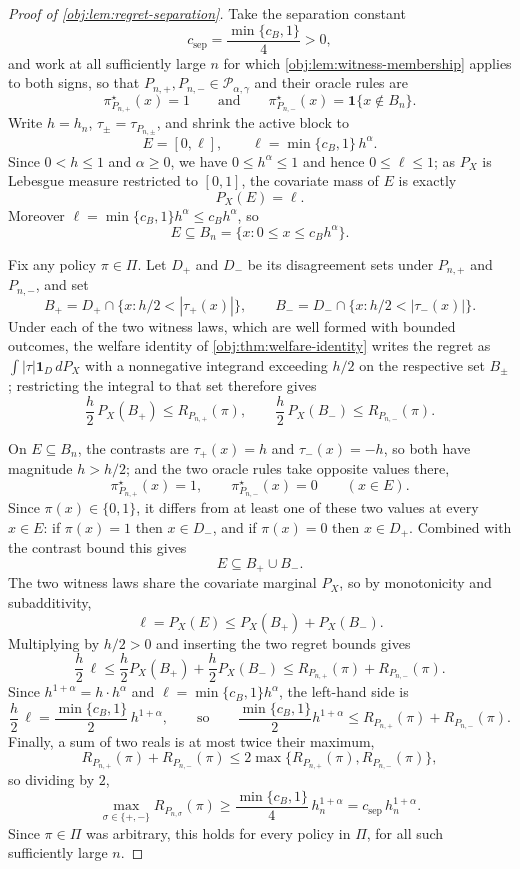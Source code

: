 \documentclass[11pt]{article}
\begin{document}
\begin{proof}[Proof of \cref{obj:lem:regret-separation}]
Take the separation constant
\[
c_{\mathrm{sep}}=\frac{\min\{c_B,1\}}{4}>0,
\]
and work at all sufficiently large \(n\) for which \cref{obj:lem:witness-membership} applies to both signs, so that \(P_{n,+},P_{n,-}\in\mathcal P_{\alpha,\gamma}\) and their oracle rules are
\[
\pi^\star_{P_{n,+}}(x)=1
\qquad\text{and}\qquad
\pi^\star_{P_{n,-}}(x)=\mathbf 1\{x\notin B_n\}.
\]
Write \(h=h_n\), \(\tau_\pm=\tau_{P_{n,\pm}}\), and shrink the active block to
\[
E=[0,\ell],
\qquad
\ell=\min\{c_B,1\}\,h^\alpha .
\]
Since \(0<h\le1\) and \(\alpha\ge0\), we have \(0\le h^\alpha\le1\) and hence \(0\le\ell\le1\); as \(P_X\) is Lebesgue measure restricted to \([0,1]\), the covariate mass of \(E\) is exactly
\[
P_X(E)=\ell .
\]
Moreover \(\ell=\min\{c_B,1\}h^\alpha\le c_Bh^\alpha\), so
\[
E\subseteq B_n=\{x:0\le x\le c_Bh^\alpha\}.
\]

Fix any policy \(\pi\in\Pi\).  Let \(D_+\) and \(D_-\) be its disagreement sets under \(P_{n,+}\) and \(P_{n,-}\), and set
\[
B_+=D_+\cap\{x:h/2<|\tau_+(x)|\},
\qquad
B_-=D_-\cap\{x:h/2<|\tau_-(x)|\}.
\]
Under each of the two witness laws, which are well formed with bounded outcomes, the welfare identity of \cref{obj:thm:welfare-identity} writes the regret as \(\int|\tau|\mathbf 1_D\,dP_X\) with a nonnegative integrand exceeding \(h/2\) on the respective set \(B_\pm\); restricting the integral to that set therefore gives
\[
\frac h2\,P_X(B_+)\le R_{P_{n,+}}(\pi),
\qquad
\frac h2\,P_X(B_-)\le R_{P_{n,-}}(\pi).
\]

On \(E\subseteq B_n\), the contrasts are \(\tau_+(x)=h\) and \(\tau_-(x)=-h\), so both have magnitude \(h>h/2\); and the two oracle rules take opposite values there,
\[
\pi^\star_{P_{n,+}}(x)=1,
\qquad
\pi^\star_{P_{n,-}}(x)=0
\qquad (x\in E).
\]
Since \(\pi(x)\in\{0,1\}\), it differs from at least one of these two values at every \(x\in E\): if \(\pi(x)=1\) then \(x\in D_-\), and if \(\pi(x)=0\) then \(x\in D_+\).  Combined with the contrast bound this gives
\[
E\subseteq B_+\cup B_- .
\]
The two witness laws share the covariate marginal \(P_X\), so by monotonicity and subadditivity,
\[
\ell=P_X(E)\le P_X(B_+)+P_X(B_-).
\]
Multiplying by \(h/2>0\) and inserting the two regret bounds gives
\[
\frac h2\,\ell
\le \frac h2 P_X(B_+)+\frac h2 P_X(B_-)
\le R_{P_{n,+}}(\pi)+R_{P_{n,-}}(\pi).
\]
Since \(h^{1+\alpha}=h\cdot h^\alpha\) and \(\ell=\min\{c_B,1\}h^\alpha\), the left-hand side is
\[
\frac h2\,\ell=\frac{\min\{c_B,1\}}{2}\,h^{1+\alpha},
\qquad\text{so}\qquad
\frac{\min\{c_B,1\}}{2}h^{1+\alpha}
\le R_{P_{n,+}}(\pi)+R_{P_{n,-}}(\pi).
\]
Finally, a sum of two reals is at most twice their maximum,
\[
R_{P_{n,+}}(\pi)+R_{P_{n,-}}(\pi)
\le 2\max\{R_{P_{n,+}}(\pi),R_{P_{n,-}}(\pi)\},
\]
so dividing by \(2\),
\[
\max_{\sigma\in\{+,-\}}R_{P_{n,\sigma}}(\pi)
\ge \frac{\min\{c_B,1\}}{4}\,h_n^{1+\alpha}
= c_{\mathrm{sep}}\,h_n^{1+\alpha}.
\]
Since \(\pi\in\Pi\) was arbitrary, this holds for every policy in \(\Pi\), for all such sufficiently large \(n\). %
\end{proof}
\end{document}
